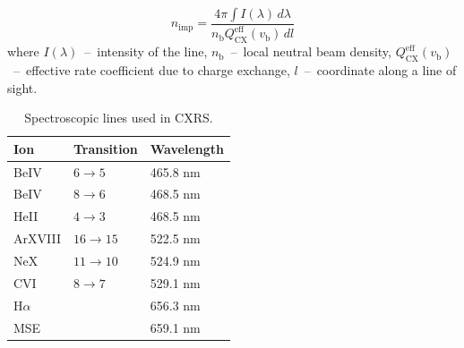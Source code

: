 \documentclass[../main.tex]{subfiles}
\begin{document}
\begin{equation}
    \label{eq:impurity_density}
    n_\text{imp} = \dfrac{4\pi \int I(\lambda)\, d\lambda}{n_\text{b} Q_\text{CX}^\text{eff}(v_\text{b})\, dl}
\end{equation}
where $I(\lambda)$~--~intensity of the line, $n_\text{b}$~--~local neutral beam density, $Q_\text{CX}^\text{eff}(v_\text{b})$~--~effective rate coefficient due to charge exchange, $l$~--~coordinate along a line of sight.

\begin{table}[!ht]
    \caption{Spectroscopic lines used in CXRS.}%
    \label{tab:cxrs_lines}
    \centering
    \begin{tabular}[]{l l l}
        \toprule
        Ion       & Transition & Wavelength \\
        \midrule
        BeIV      & $6\to5$    & 465.8 nm   \\
        BeIV      & $8\to6$    & 468.5 nm   \\
        HeII      & $4\to3$    & 468.5 nm   \\
        \midrule
        ArXVIII   & $16\to15$  & 522.5 nm   \\
        NeX       & $11\to10$  & 524.9 nm   \\
        CVI       & $8\to7$    & 529.1 nm   \\
        \midrule
        H$\alpha$ &            & 656.3 nm   \\
        MSE       &            & 659.1 nm   \\
        \bottomrule
    \end{tabular}
\end{table}


\end{document}
